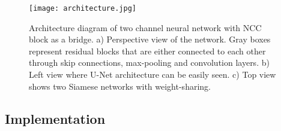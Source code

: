 \documentclass{article}
\begin{document}


\begin{figure}[h]
  \centering
  
  \texttt{[image: architecture.jpg]}
  \caption{Architecture diagram of two channel neural network with NCC block as a bridge. a) Perspective view of the network. Gray boxes represent residual blocks that are either connected to each other through skip connections, max-pooling and convolution layers. b) Left view where U-Net architecture can be easily seen. c) Top view shows two Siamese networks with weight-sharing.}
  \label{architecture}
\end{figure}

\subsection{Implementation} 
  
\end{document}
